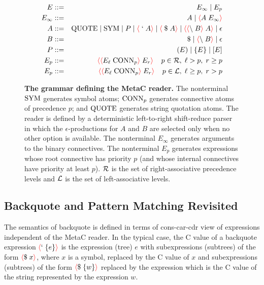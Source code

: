 \documentclass{article}
\newcommand{\fopen}{{\color{red} \langle}}
\newcommand{\fclose}{{\color{red} \rangle}}
\begin{document}
\begin{figure}
  
\begin{eqnarray*}
  E & ::= & E_\infty \;|\; E_p \\
  E_\infty & ::= & A \;|\; \fopen A \; E_\infty \fclose \\
  A & ::= & \quot \;|\; \sym \;|\; P  \;|\; \fopen \; `\;A\fclose \;|\; \fopen \; \$\;A\fclose \;|\;\fopen\fopen\backslash\; B \fclose\;A \fclose \;|\; \epsilon \\
  B & ::= & \$ \;|\; \fopen \backslash\;B \fclose \;|\; \epsilon \\
  P & ::= & (E) \;|\; \{E\} \;|\; [E] \\
  E_p & ::= & \fopen \fopen  E_\ell\;\conn_p \fclose \;E_r\fclose\;\;\;\;p \in {\cal R}, \;\ell > p, \; r \geq p \\
  E_p & ::= & \fopen \fopen E_\ell\;\conn_p \fclose \;E_r\fclose\;\;\;\;p \in {\cal L}, \; \ell \geq p,\; r > p
\end{eqnarray*}

\caption{{\bf The grammar defining the MetaC reader.}
The nonterminal $\mathrm{SYM}$ generates symbol atoms; $\mathrm{CONN}_p$ generates connective atoms of precedence $p$; and $\mathrm{QUOTE}$ generates string quotation atoms.
The reader is defined by a deterministic left-to-right shift-reduce parser
in which the $\epsilon$-productions for $A$ and $B$ are selected only when no other option is available.
The nonterminal $E_\infty$ generates arguments to the binary connectives.
The nonterminal $E_p$ generates expressions whose root connective has priority $p$ (and whose internal connectives have priority at least $p$).
${\cal R}$ is the set of right-associative precedence levels and ${\cal L}$ is the set of left-associative levels.
}
\label{fig:grammar}
\end{figure}

\subsection{Backquote and Pattern Matching Revisited}

The semantics of backquote is defined in terms of cons-car-cdr view of expressions independent of the MetaC reader.
In the typical case, the C value of a backquote expression
$\fopen ` \;\{e\}\fclose$ is the expression (tree) $e$ with subexpressions (subtrees) of the form $\fopen \$\;x \fclose$, where $x$ is a symbol,
replaced by the C value of $x$
and subexpressions (subtrees) of the form $\fopen \$\;\{w\}\fclose$ replaced by the expression which is the C value of the string represented by the expression $w$.
\end{document}

